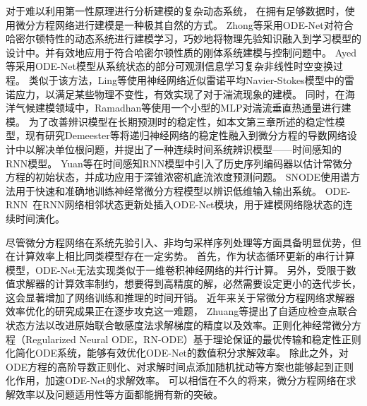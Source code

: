 对于难以利用第一性原理进行分析建模的复杂动态系统，
在拥有足够数据时，使用微分方程网络进行建模是一种极其自然的方式。
Zhong等\cite{zhong2019symplectic}采用ODE-Net对符合哈密尔顿特性的动态系统进行建模学习，巧妙地将物理先验知识融入到学习模型的设计中。并有效地应用于符合哈密尔顿性质的刚体系统建模与控制问题中。
Ayed等\cite{ayed2019learning}采用ODE-Net模型从系统状态的部分可观测信息学习复杂非线性时空变换过程。
类似于该方法，Ling等\cite{ling2016reynolds}使用神经网络近似雷诺平均Navier-Stokes模型中的雷诺应力，以满足某些物理不变性，有效实现了对于湍流现象的建模。
同时，在海洋气候建模领域中，Ramadhan等\cite{ramadhan2020capturing}使用一个小型的MLP对湍流垂直热通量进行建模。
为了改善辨识模型在长期预测时的稳定性，如本文第三章所述的稳定性模型，现有研究Demeester等\cite{Demeester2019}将递归神经网络的稳定性融入到微分方程的导数网络设计中以解决单位根问题，并提出了一种连续时间系统辨识模型——时间感知的RNN模型。
Yuan等\cite{Yuan2022}在时间感知RNN模型中引入了历史序列编码器以估计常微分方程的初始状态，并成功应用于深锥浓密机底流浓度预测问题。
SNODE\cite{Quaglino2019}使用谱方法用于快速和准确地训练神经常微分方程模型以辨识低维输入输出系统。
ODE-RNN~\cite{Rubanova2019}在RNN网络相邻状态更新处插入ODE-Net模块，用于建模网络隐状态的连续时间演化。



尽管微分方程网络在系统先验引入、非均匀采样序列处理等方面具备明显优势，但在计算效率上相比同类模型存在一定劣势。
首先，作为状态循环更新的串行计算模型，ODE-Net无法实现类似于一维卷积神经网络的并行计算。
另外，受限于数值求解器的计算效率制约，想要得到高精度的解，必然需要设定更小的迭代步长，这会显著增加了网络训练和推理的时间开销。
近年来关于常微分方程网络求解器效率优化的研究成果正在逐步攻克这一难题，
Zhuang等\cite{Zhuang2020}提出了自适应检查点联合状态方法以改进原始联合敏感度法求解梯度的精度以及效率。正则化神经常微分方程（Regularized Neural ODE，RN-ODE）\cite{J2020}基于理论保证的最优传输和稳定性正则化简化ODE系统，能够有效优化ODE-Net的数值积分求解效率。
除此之外，对ODE方程的高阶导数正则化\cite{kelly2020}、对求解时间点添加随机扰动\cite{Ghosh2020}等方案也能够起到正则化作用，加速ODE-Net的求解效率。
可以相信在不久的将来，微分方程网络在求解效率以及问题适用性等方面都能拥有新的突破。


